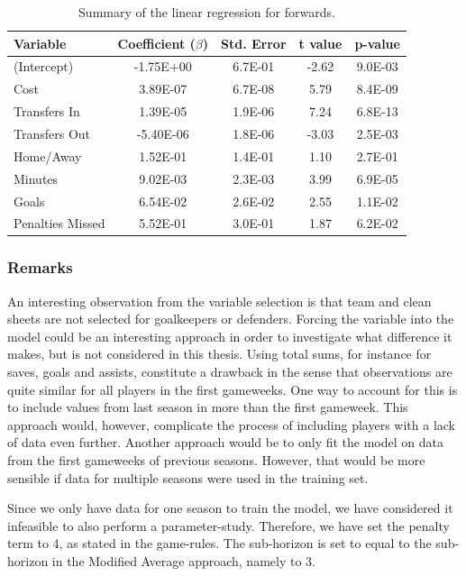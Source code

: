 \begin{table}[H]
\centering
\begin{tabular}{|l|c|c|c|c|}
\hline
Variable         & Coefficient ($\beta$)  & Std. Error & t value & p-value \\ \hline
(Intercept)      & -1.75E+00 & 6.7E-01    & -2.62   & 9.0E-03 \\
Cost             & 3.89E-07  & 6.7E-08    & 5.79    & 8.4E-09 \\
Transfers In     & 1.39E-05  & 1.9E-06    & 7.24    & 6.8E-13 \\
Transfers Out    & -5.40E-06 & 1.8E-06    & -3.03   & 2.5E-03 \\
Home/Away        & 1.52E-01  & 1.4E-01    & 1.10    & 2.7E-01 \\
Minutes          & 9.02E-03  & 2.3E-03    & 3.99    & 6.9E-05 \\
Goals            & 6.54E-02  & 2.6E-02    & 2.55    & 1.1E-02 \\
Penalties Missed & 5.52E-01  & 3.0E-01    & 1.87    & 6.2E-02 \\
\hline
\end{tabular}
\caption{Summary of the linear regression for forwards.}
\label{tab:coef_FWD}
\end{table}

\subsubsection{Remarks}

An interesting observation from the variable selection is that team and clean sheets are not selected for goalkeepers or defenders. Forcing the variable into the model could be an interesting approach in order to investigate what difference it makes, but is not considered in this thesis. Using total sums, for instance for saves, goals and assists, constitute a drawback in the sense that observations are quite similar for all players in the first gameweeks. One way to account for this is to include values from last season in more than the first gameweek. This approach would, however, complicate the process of including players with a lack of data even further. Another approach would be to only fit the model on data from the first gameweeks of previous seasons. However, that would be more sensible if data for multiple seasons were used in the training set.

\newpar

Since we only have data for one season to train the model, we have considered it infeasible to also perform a parameter-study. Therefore, we have set the penalty term to 4, as stated in the game-rules. The sub-horizon is set to equal to the sub-horizon in the Modified Average approach, namely to 3.

